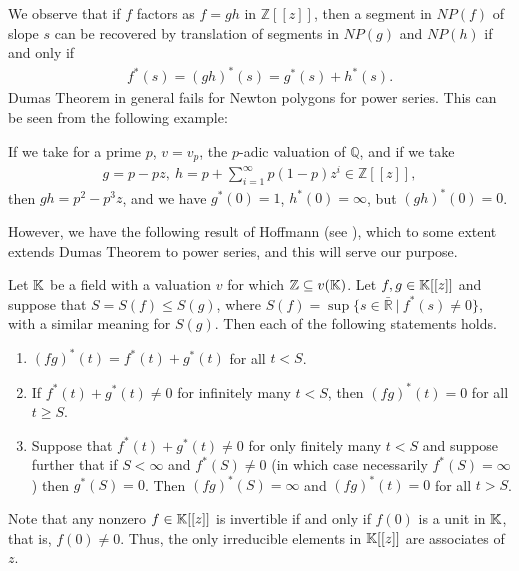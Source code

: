 \documentclass[12pt,reqno]{amsart}%
\begin{document}
We observe that if $f$ factors as $f=gh$ in $\mathbb{Z}[[z]]$, then a segment in $NP(f)$ of slope $s$ can be recovered by translation of segments in $NP(g)$ and $NP(h)$ if and only if
\begin{eqnarray*}
f^*(s)=(gh)^*(s)=g^*(s)+h^*(s).
\end{eqnarray*}
Dumas Theorem \cite{D} in general fails for Newton polygons for power series. This can be seen from the following example:

If we take for a prime $p$, $v=v_p$, the $p$-adic valuation of $\mathbb{Q}$,  and if we take
\begin{eqnarray*}
g=p-pz,~h=p+\sum_{i=1}^\infty p(1-p)z^i\in \mathbb{Z}[[z]],
\end{eqnarray*}
then  $gh=p^2-p^3z$, and we have $g^*(0)=1$, $h^*(0)=\infty$, but $(gh)^*(0)=0$.

However, we have the following result of Hoffmann (see \cite[Theorem 1]{Hoffman1994}), which to some extent extends Dumas Theorem to power series, and this will serve our purpose.
 \begin{thmx}\label{th:E} Let $\mathbb{K}$ be a field with a valuation $v$ for which $\mathbb{Z}\subseteq v(\mathbb{K})$.  Let $f,g\in \mathbb{K}[[z]]$ and suppose that $S=S(f)\leq S(g)$, where $S(f)=\sup\{s\in \bar{\mathbb{R}}~|~f^*(s)\neq 0\}$,  with a similar meaning for $S(g)$. Then each of the following statements holds.
 \begin{enumerate}%
    \item[(i)] $(fg)^*(t)=f^*(t)+g^*(t)$ for all $t<S$.
    \item[(ii)] If $f^*(t)+g^*(t)\neq 0$ for infinitely many $t<S$, then  $(fg)^*(t)=0$ for all $t\geq S$.
    \item[(iii)]  Suppose that $f^*(t)+g^*(t)\neq 0$ for only finitely many $t<S$ and suppose further that if $S<\infty$ and $f^*(S)\neq 0$ (in which case necessarily $f^*(S)=\infty$) then $g^*(S)=0$. Then $(fg)^*(S)=\infty$ and $(fg)^*(t)=0$ for all $t>S$.
\end{enumerate}
 \end{thmx}
Note that any nonzero $f\in \mathbb{K}[[z]]$ is invertible if and only if $f(0)$ is a unit in $\mathbb{K}$, that is, $f(0)\neq 0$. Thus, the only irreducible elements in $\mathbb{K}[[z]]$ are associates of $z$.
\end{document}
